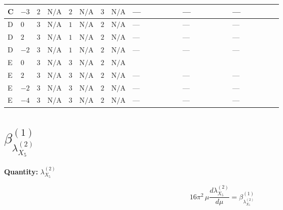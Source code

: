 \documentclass[8pt]{article}
\begin{document}
\begin{landscape}
\begin{longtable}{@{}llcccccc >{\raggedright\arraybackslash}p{0.21\linewidth} >{\raggedright\arraybackslash}p{0.21\linewidth} >{\raggedright\arraybackslash}p{0.21\linewidth}@{}}
\midrule
C & $-3$ & $2$ & $\text{N/A}$ & $2$ & $\text{N/A}$ & $3$ & $\text{N/A}$ & --- & --- & --- \\
\midrule
D & $0$ & $3$ & $\text{N/A}$ & $1$ & $\text{N/A}$ & $2$ & $\text{N/A}$ & --- & --- & --- \\
\midrule
D & $2$ & $3$ & $\text{N/A}$ & $1$ & $\text{N/A}$ & $2$ & $\text{N/A}$ & --- & --- & --- \\
\midrule
D & $-2$ & $3$ & $\text{N/A}$ & $1$ & $\text{N/A}$ & $2$ & $\text{N/A}$ & --- & --- & --- \\
\midrule
E & $0$ & $3$ & $\text{N/A}$ & $3$ & $\text{N/A}$ & $2$ & $\text{N/A}$ & \scriptsize\adjustbox{max width=\linewidth}{$\begin{gathered} +{\lambda_{S_1}^{(A)}} (-4 {\lambda_{X_{5}}^{(1)}}-2 {\lambda_{X_{5}}^{(2)}})\end{gathered}$} & \scriptsize\adjustbox{max width=\linewidth}{$\begin{gathered} +{\lambda_{S_2}^{(1)}} (8 {\lambda_{X_{5}}^{(1)}}+2 {\lambda_{X_{5}}^{(2)}})\end{gathered}$} & \scriptsize\adjustbox{max width=\linewidth}{$\begin{gathered} +{\lambda_{S_2}^{(A)}} (4 {\lambda_{X_{5}}^{(1)}}+2 {\lambda_{X_{5}}^{(2)}})\end{gathered}$} \\
\midrule
E & $2$ & $3$ & $\text{N/A}$ & $3$ & $\text{N/A}$ & $2$ & $\text{N/A}$ & --- & --- & --- \\
\midrule
E & $-2$ & $3$ & $\text{N/A}$ & $3$ & $\text{N/A}$ & $2$ & $\text{N/A}$ & --- & --- & --- \\
\midrule
E & $-4$ & $3$ & $\text{N/A}$ & $3$ & $\text{N/A}$ & $2$ & $\text{N/A}$ & --- & --- & --- \\
\midrule
\bottomrule
\end{longtable}
\clearpage
\section*{$\beta_{{\lambda_{X_{5}}^{(2)}}}^{(1)}$}
\noindent\textbf{Quantity: }${\lambda_{X_{5}}^{(2)}}$\par\smallskip
\[16\pi^2\,\mu\frac{d {\lambda_{X_{5}}^{(2)}}}{d\mu}=\beta_{{\lambda_{X_{5}}^{(2)}}}^{(1)}\]

\end{landscape}
\end{document}
